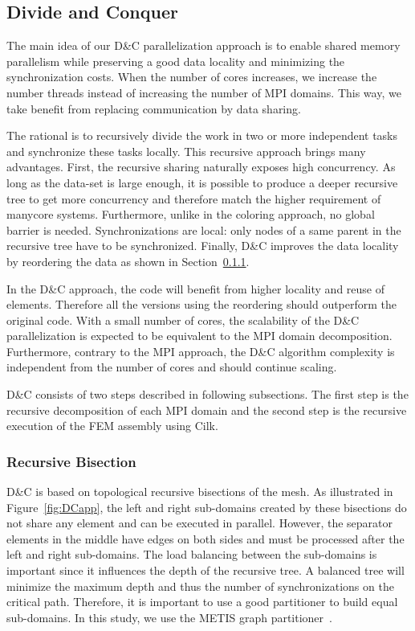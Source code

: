 \documentclass[10pt]{IOS-Book-Article}
\begin{document}
\subsection{Divide and Conquer}
\label{sec:dc}

The main idea of our D\&C parallelization approach is to enable shared memory parallelism while preserving a good data locality and minimizing the synchronization costs.
When the number of cores increases, we increase the number threads instead of increasing the number of MPI domains.
This way, we take benefit from replacing communication by data sharing.

The rational is to recursively divide the work in two or more independent tasks and synchronize these tasks locally.
This recursive approach brings many advantages.
First, the recursive sharing naturally exposes high concurrency.
As long as the data-set is large enough, it is possible to produce a deeper recursive tree to get more concurrency and therefore match the higher requirement of manycore systems.
Furthermore, unlike in the coloring approach, no global barrier is needed.
Synchronizations are local: only nodes of a same parent in the recursive tree have to be synchronized.
Finally, D\&C improves the data locality by reordering the data as shown in Section~\ref{sec:DCrec}.

In the D\&C approach, the code will benefit from higher locality and reuse of elements.
Therefore all the versions using the reordering should outperform the original code. With a small number of cores, the scalability of the D\&C parallelization is expected to be equivalent to the MPI domain decomposition.
Furthermore, contrary to the MPI approach, the D\&C algorithm complexity is independent from the number of cores and should continue scaling.


D\&C consists of two steps described in following subsections.
The first step is the recursive decomposition of each MPI domain and the second step is the recursive execution of the FEM assembly using Cilk.

\subsubsection{Recursive Bisection}
\label{sec:DCrec}
D\&C is based on topological recursive bisections of the mesh.
As illustrated in Figure~\ref{fig:DCapp}, the left and right sub-domains created by these bisections do not share any element and can be executed in parallel.
However, the separator elements in the middle have edges on both sides and must be processed after the left and right sub-domains.
The load balancing between the sub-domains is important since it influences the depth of the recursive tree.
A balanced tree will minimize the maximum depth and thus the number of synchronizations on the critical path.
Therefore, it is important to use a good partitioner to build equal sub-domains.
In this study, we use the METIS graph partitioner~\cite{Metis}.
\end{document}

